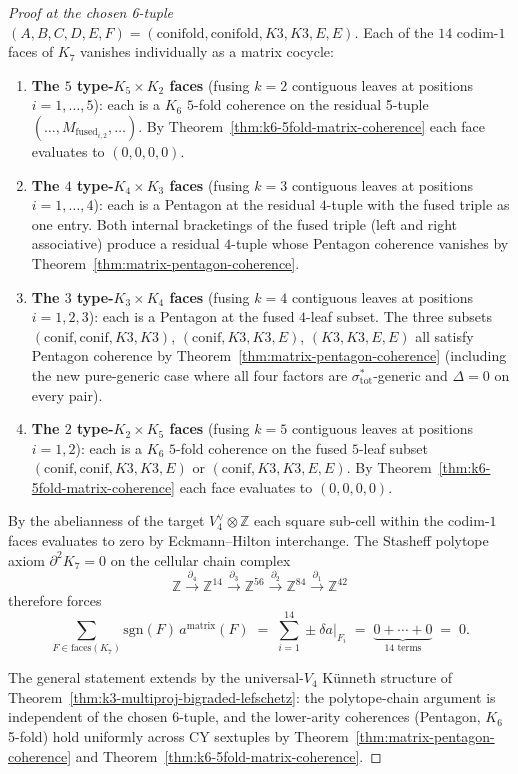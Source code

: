 \begin{proof}[Proof at the chosen 6-tuple
 $(A, B, C, D, E, F) = (\mathrm{conifold},
 \mathrm{conifold}, K3, K3, E, E)$]
Each of the $14$ codim-$1$ faces of $K_7$ vanishes individually as a
matrix cocycle:
\begin{enumerate}
\item \textbf{The $5$ type-$K_5 \times K_2$ faces} \textup{(}fusing
 $k = 2$ contiguous leaves at positions $i = 1, \ldots, 5$\textup{):}
 each is a $K_6$ $5$-fold coherence on the residual 5-tuple
 $(\ldots, M_{\mathrm{fused}_{i,2}}, \ldots)$. By
 Theorem~\ref{thm:k6-5fold-matrix-coherence} each face evaluates
 to $(0, 0, 0, 0)$.
\item \textbf{The $4$ type-$K_4 \times K_3$ faces} \textup{(}fusing
 $k = 3$ contiguous leaves at positions $i = 1, \ldots, 4$\textup{):}
 each is a Pentagon at the residual $4$-tuple with the fused
 triple as one entry. Both internal bracketings of the fused
 triple \textup{(}left and right associative\textup{)} produce a
 residual $4$-tuple whose Pentagon coherence vanishes by
 Theorem~\ref{thm:matrix-pentagon-coherence}.
\item \textbf{The $3$ type-$K_3 \times K_4$ faces} \textup{(}fusing
 $k = 4$ contiguous leaves at positions $i = 1, 2, 3$\textup{):}
 each is a Pentagon at the fused $4$-leaf subset. The three
 subsets $(\mathrm{conif}, \mathrm{conif}, K3, K3)$,
 $(\mathrm{conif}, K3, K3, E)$, $(K3, K3, E, E)$ all satisfy
 Pentagon coherence by Theorem~\ref{thm:matrix-pentagon-coherence}
 \textup{(}including the new pure-generic case where all four
 factors are $\sigma_{\mathrm{tot}}^*$-generic and $\Delta = 0$
 on every pair\textup{).}
\item \textbf{The $2$ type-$K_2 \times K_5$ faces} \textup{(}fusing
 $k = 5$ contiguous leaves at positions $i = 1, 2$\textup{):}
 each is a $K_6$ $5$-fold coherence on the fused $5$-leaf subset
 $(\mathrm{conif}, \mathrm{conif}, K3, K3, E)$ or
 $(\mathrm{conif}, K3, K3, E, E)$. By
 Theorem~\ref{thm:k6-5fold-matrix-coherence} each face evaluates
 to $(0, 0, 0, 0)$.
\end{enumerate}

By the abelianness of the target $V_4^\vee \otimes \mathbb{Z}$ each
square sub-cell within the codim-$1$ faces evaluates to zero by
Eckmann--Hilton interchange. The Stasheff polytope axiom
$\partial^2 K_7 = 0$ on the cellular chain complex
\[
 \mathbb{Z}
 \xrightarrow{\partial_4} \mathbb{Z}^{14}
 \xrightarrow{\partial_3} \mathbb{Z}^{56}
 \xrightarrow{\partial_2} \mathbb{Z}^{84}
 \xrightarrow{\partial_1} \mathbb{Z}^{42}
\]
therefore forces
\[
 \sum_{F \in \mathrm{faces}(K_7)} \mathrm{sgn}(F)\, a^{\mathrm{matrix}}(F)
 \;=\; \sum_{i = 1}^{14} \pm \delta a |_{F_i}
 \;=\; \underbrace{0 + \cdots + 0}_{14 \text{ terms}} \;=\; 0.
\]

The general statement extends by the universal-$V_4$ K\"unneth structure
of Theorem~\ref{thm:k3-multiproj-bigraded-lefschetz}: the polytope-chain
argument is independent of the chosen 6-tuple, and the lower-arity
coherences \textup{(}Pentagon, $K_6$ 5-fold\textup{)} hold uniformly
across CY sextuples by Theorem~\ref{thm:matrix-pentagon-coherence} and
Theorem~\ref{thm:k6-5fold-matrix-coherence}.
\end{proof}

